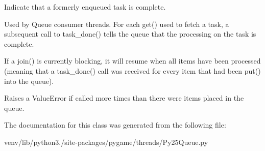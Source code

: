 \begin{DoxyVerb}Indicate that a formerly enqueued task is complete.

Used by Queue consumer threads.  For each get() used to fetch a task,
a subsequent call to task_done() tells the queue that the processing
on the task is complete.

If a join() is currently blocking, it will resume when all items
have been processed (meaning that a task_done() call was received
for every item that had been put() into the queue).

Raises a ValueError if called more times than there were items
placed in the queue.
\end{DoxyVerb}
 

The documentation for this class was generated from the following file\+:\begin{DoxyCompactItemize}
\item 
venv/lib/python3./site-\/packages/pygame/threads/Py25\+Queue.\+py\end{DoxyCompactItemize}
